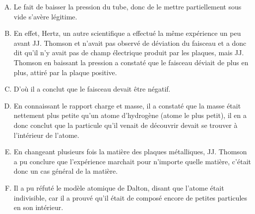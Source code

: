 \documentclass[../main.tex]{subfiles}
\begin{document}
\begin{enumerate}[I]
\begin{enumerate}[A. ]
        \item Le fait de baisser la pression du tube, donc de le mettre partiellement sous vide s'avère légitime.
        \item En effet, Hertz, un autre scientifique a effectué la même expérience un peu avant JJ. Thomson et n'avait pas observé de déviation du faisceau et a donc dit qu'il n'y avait pas de champ électrique produit par les plaques, mais JJ. Thomson en baissant la pression a constaté que le faisceau déviait de plus en plus, attiré par la plaque positive.
        \item D'où il a conclut que le faisceau devait être négatif.
        \item En connaissant le rapport charge et masse, il a constaté que la masse était nettement plus petite qu'un atome d'hydrogène (atome le plus petit), il en a donc conclut que la particule qu'il venait de découvrir devait se trouver à l'intérieur de l'atome.
        \item En changeant plusieurs fois la matière des plaques métalliques, JJ. Thomson a pu conclure que l'expérience marchait pour n'importe quelle matière, c'était donc un cas général de la matière.
        \item Il a pu réfuté le modèle atomique de Dalton, disant que l'atome était indivisible, car il a prouvé qu'il était de composé encore de petites particules en son intérieur.
    \end{enumerate}
\end{enumerate}



\end{document}
